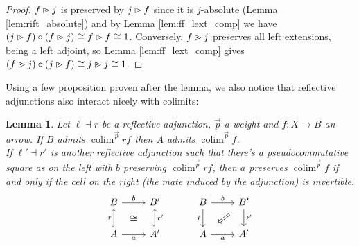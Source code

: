 \documentclass[10pt,a4paper]{article}
\newcommand{\plext}{\mathbin{{\rhd}\mathclap{\mspace{-17.5mu}\cdot}}}
\newcommand{\simeqq}{\cong}
\DeclareMathOperator{\colim}{colim}
\theoremstyle{plain}
\newtheorem{lemma}[theorem]{Lemma}
\theoremstyle{definition}
\theoremstyle{remark}
\begin{document}
\begin{proof}
    $f\plext j$ is preserved by $j\plext f$ since it is $j$-absolute (Lemma \ref{lem:rift_absolute}) and by Lemma \ref{lem:ff_lext_comp} we have $(j\plext f)\circ(f\plext j) \simeqq f\plext f \simeqq 1$. Conversely, $f\plext j$ preserves all left extensions, being a left adjoint, so Lemma \ref{lem:ff_lext_comp} gives $(f\plext j)\circ(j\plext f) \simeqq j\plext j\simeqq 1$.
\end{proof}

Using a few proposition proven after the lemma, we also notice that reflective adjunctions also interact nicely with colimits:

\begin{lemma}
    \label{lem:refl_adj_colims}
    Let $\ell\dashv r$ be a reflective adjunction, $\vec p$ a weight and $f : X \to B$ an arrow. If $B$ admits $\colim^{\vec p}rf$ then $A$ admits $\colim^{\vec p}f$.\\
    If $\ell'\dashv r'$ is another reflective adjunction such that there's a pseudocommutative square as on the left with $b$ preserving $\colim^{\vec p}rf$, then $a$ preserves $\colim^{\vec p}f$ if and only if the cell on the right (the mate induced by the adjunction) is invertible.
    \[\begin{tikzcd}
        B \ar[r, "b", ""{anchor=center,name=t}] & B'\\
        \ar[u, hook, "r"] A \ar[r, "a"', ""{anchor=center,name=b}] & A' \ar[u, hook, "r'"']
        \ar[from=t, to=b, phantom, "\simeqq"{anchor=center}]
    \end{tikzcd}
    \hspace{3em}
    \begin{tikzcd}
        \ar[d, "\ell"'] B \ar[r, "b"] & B' \ar[dl, Rightarrow, shorten=3mm] \ar[d, "\ell'"]\\
        A \ar[r, "a"'] & A'
    \end{tikzcd}\]
\end{lemma}
\end{document}
